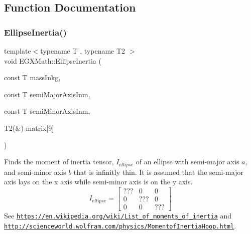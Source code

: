 \subsection{Function Documentation}
\mbox{\label{group___e_g_x_math-_geometry-2_d-_ellipse-_inertia_ga10a3049c2f04b50f271fb01dc62e4cf8}} 
\subsubsection{\texorpdfstring{Ellipse\+Inertia()}{EllipseInertia()}\hspace{0.1cm}{\footnotesize\ttfamily [1/3]}}
{\footnotesize\ttfamily template$<$typename T , typename T2 $>$ \\
void E\+G\+X\+Math\+::\+Ellipse\+Inertia (\begin{DoxyParamCaption}\item[{const T}]{mass\+Inkg,  }\item[{const T}]{semi\+Major\+Axis\+Inm,  }\item[{const T}]{semi\+Minor\+Axis\+Inm,  }\item[{T2(\&)}]{matrix\mbox{[}9\mbox{]} }\end{DoxyParamCaption})}



Finds the moment of inertia tensor, $I_{ellipse}$ of an ellipse with semi-\/major axis $a$, and semi-\/minor axis $b$ that is infinitly thin. It is assumed that the semi-\/major axis lays on the x axis while semi-\/minor axis is on the y axis. \[ I_{ellipse}=\begin{bmatrix} ??? & 0 & 0\\ 0 & ??? & 0\\ 0 & 0 & ??? \end{bmatrix} \] See \href{https://en.wikipedia.org/wiki/List_of_moments_of_inertia}{\tt https\+://en.\+wikipedia.\+org/wiki/\+List\+\_\+of\+\_\+moments\+\_\+of\+\_\+inertia} and \href{http://scienceworld.wolfram.com/physics/MomentofInertiaHoop.html}{\tt http\+://scienceworld.\+wolfram.\+com/physics/\+Momentof\+Inertia\+Hoop.\+html}. 


